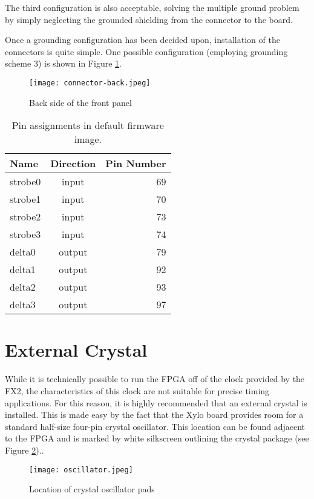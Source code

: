 The third configuration is also acceptable, solving the multiple
ground problem by simply neglecting the grounded shielding from the
connector to the board.

Once a grounding configuration has been decided upon, installation of
the connectors is quite simple. One possible configuration (employing
grounding scheme 3) is shown in Figure \ref{fig:front-panel-rear}.

\begin{figure}
  \center
  \texttt{[image: connector-back.jpeg]}
  \caption{Back side of the front panel}
  \label{fig:front-panel-rear}
\end{figure}

\begin{table}
  \center
  \begin{tabular}{|lcr|}
    \hline
    Name    & Direction & Pin Number \\
    \hline
    strobe0 & input  & 69 \\
    strobe1 & input  & 70 \\
    strobe2 & input  & 73 \\
    strobe3 & input  & 74 \\
    \hline
    delta0  & output & 79 \\
    delta1  & output & 92 \\
    delta2  & output & 93 \\
    delta3  & output & 97 \\
    \hline
  \end{tabular}
  \caption{Pin assignments in default firmware image.}
  \label{table:pins}
\end{table}


\section{External Crystal}

While it is technically possible to run the FPGA off of the clock
provided by the FX2, the characteristics of this clock are not
suitable for precise timing applications. For this reason, it is
highly recommended that an external crystal is installed. This is made
easy by the fact that the Xylo board provides room for a standard
half-size four-pin crystal oscillator. This location can be found
adjacent to the FPGA and is marked by white silkscreen outlining the
crystal package (see Figure \ref{fig:crystal})..

\begin{figure}
  \center
  \texttt{[image: oscillator.jpeg]}
  \caption{Location of crystal oscillator pads}
  \label{fig:crystal}
\end{figure}

